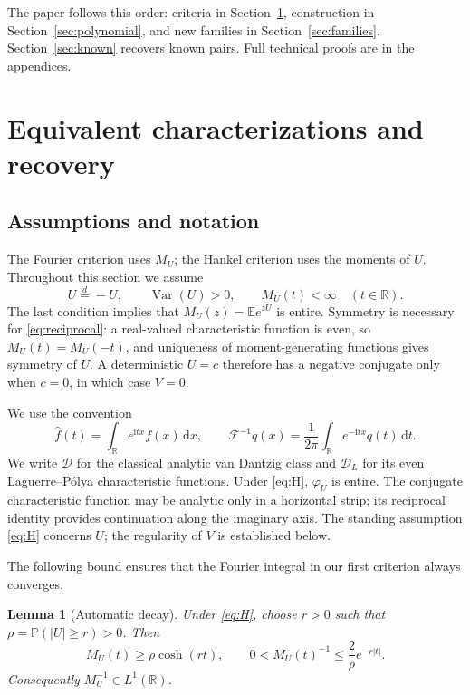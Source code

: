\documentclass[11pt,twoside]{article}
\theoremstyle{journalplain}
\numberwithin{equation}{section}
\newtheorem{lemma}[theorem]{Lemma}
\theoremstyle{journaldefinition}
\newcommand{\R}{\mathbb R}
\newcommand{\E}{\mathbb E}
\newcommand{\Prob}{\mathbb P}
\newcommand{\D}{\mathcal D}
\newcommand{\DL}{\mathcal D_L}
\newcommand{\dd}{\,\mathrm d}
\newcommand{\ii}{\mathrm i}
\DeclareMathOperator{\Var}{Var}
\begin{document}
The paper follows this order: criteria in Section~\ref{sec:criteria}, construction in Section~\ref{sec:polynomial}, and new families in Section~\ref{sec:families}. Section~\ref{sec:known} recovers known pairs. Full technical proofs are in the appendices.

\section{Equivalent characterizations and recovery}\label{sec:criteria}
\subsection{Assumptions and notation}
The Fourier criterion uses $M_U$; the Hankel criterion uses the moments of $U$. Throughout this section we assume
\begin{equation}\tag{H}\label{eq:H}
 U\overset d=-U,\qquad \Var(U)>0,\qquad M_U(t)<\infty\quad(t\in\R).
\end{equation}
The last condition implies that $M_U(z)=\E e^{zU}$ is entire. Symmetry is necessary for \eqref{eq:reciprocal}: a real-valued characteristic function is even, so $M_U(t)=M_U(-t)$, and uniqueness of moment-generating functions gives symmetry of $U$. A deterministic $U=c$ therefore has a negative conjugate only when $c=0$, in which case $V=0$.

We use the convention
\[
 \widehat f(t)=\int_\R e^{\ii tx}f(x)\dd x,\qquad
 \mathcal F^{-1}q(x)=\frac1{2\pi}\int_\R e^{-\ii tx}q(t)\dd t.
\]
We write $\D$ for the classical analytic van Dantzig class and $\DL$ for its even Laguerre--P\'olya characteristic functions. Under \eqref{eq:H}, $\varphi_U$ is entire. The conjugate characteristic function may be analytic only in a horizontal strip; its reciprocal identity provides continuation along the imaginary axis. The standing assumption \eqref{eq:H} concerns $U$; the regularity of $V$ is established below.

The following bound ensures that the Fourier integral in our first criterion always converges.

\begin{lemma}[Automatic decay]\label{lem:decay}
Under \eqref{eq:H}, choose $r>0$ such that $\rho=\Prob(|U|\ge r)>0$. Then
\begin{equation}\label{eq:decay}
 M_U(t)\ge\rho\cosh(rt),\qquad
 0<M_U(t)^{-1}\le\frac2\rho e^{-r|t|}.
\end{equation}
Consequently $M_U^{-1}\in L^1(\R)$.
\end{lemma}
\end{document}
